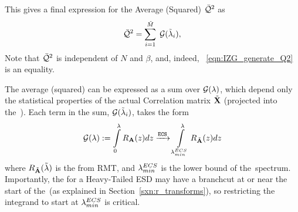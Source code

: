 This gives a final expression for the Average \LayerQuality (Squared) $\bar{\mathcal{Q}}^{2}$ as
\begin{equation}
\label{eqn:Q2_result}
\bar{\mathcal{Q}}^{2} = \sum\limits_{i=1}^{\tilde{M}}\;\mathcal{G}(\tilde{\lambda}_{i}),
\end{equation}
Note that $\bar{\mathcal{Q}}^{2}$ is independent of $N$ and $\beta$,
and, indeed, \EQN~\ref{eqn:IZG_generate_Q2} is an equality.

The average \Quality (squared) can be expressed as a sum over
\GeneratingFunctions $\mathcal{G(\lambda)}$, which depend only the statistical properties of the
actual \Teacher Correlation  matrix  $\tilde{\mathbf{X}}$ (projected into the~\ECS).
Each term in the sum, $\mathcal{G}(\tilde{\lambda}_{i})$, takes the form
\begin{equation}
\label{eqn:generating_function_A}
 \mathcal{G(\lambda)}:=\int\limits_{0}^{\lambda}R_{\mathbf{A}}(z)dz \xrightarrow{\text{\texttt{ECS}}}\int\limits_{\lambda^{ECS}_{min}}^{\lambda}R_{\tilde{\mathbf{A}}}(z)dz
\end{equation}
where $R_{\tilde{\mathbf{A}}}(\tilde{\lambda})$ is the \RTransform from RMT,
and $\lambda^{ECS}_{min}$ is the lower bound of the~\ECS spectrum.
Importantly, the \RTransform for a Heavy-Tailed ESD may have a branchcut at or near the
start of the~\ECS (as explained in Section~\ref{sxn:r_transforms}), so restricting the integrand
to start at $\lambda^{ECS}_{min}$ is critical.



%
%

